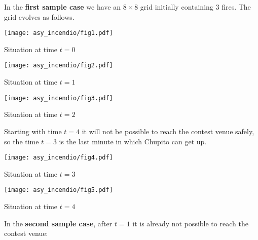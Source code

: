 \Examples

\begin{example}
%
%
\end{example}



\Explanation

In the \textbf{first sample case} we have an $8 \times 8$ grid initially
containing $3$ fires. The grid evolves as follows.

\begin{center}
	\begin{minipage}{0.31\linewidth}
		\texttt{[image: asy\_incendio/fig1.pdf]}
		\caption*{Situation at time $t=0$}
	\end{minipage}
	\hspace{0.02\linewidth}
	\begin{minipage}{0.31\linewidth}
		\texttt{[image: asy\_incendio/fig2.pdf]}
		\caption*{Situation at time $t=1$}
	\end{minipage}
	\hspace{0.02\linewidth}
	\begin{minipage}{0.31\linewidth}
		\texttt{[image: asy\_incendio/fig3.pdf]}
		\caption*{Situation at time $t=2$}
	\end{minipage}
\end{center}

Starting with time $t = 4$ it will not be possible to reach the contest venue
safely, so the time $t = 3$ is the last minute in which Chupito can get up.

\begin{center}
	\begin{minipage}{0.31\linewidth}
		\texttt{[image: asy\_incendio/fig4.pdf]}
		\caption*{Situation at time $t=3$}
	\end{minipage}
	\hspace{0.03\linewidth}
	\begin{minipage}{0.31\linewidth}
		\texttt{[image: asy\_incendio/fig5.pdf]}
		\caption*{Situation at time $t=4$}
	\end{minipage}
\end{center}

In the \textbf{second sample case}, after $t = 1$ it is already not possible to
reach the contest venue:

